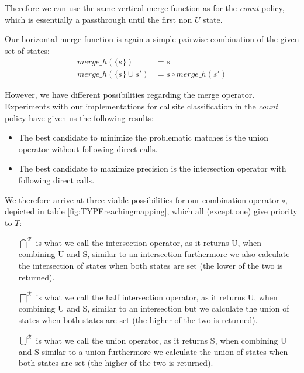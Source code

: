 Therefore we can use the same vertical merge function as for the \emph{count} policy, which is essentially a passthrough until the first non $U$ state.

Our horizontal merge function is again a simple pairwise combination of the given set of states:
\begin{align}
merge\_h(\{s\}) &= s\\
merge\_h(\{s\} \cup s') &= s \circ merge\_h(s')
\end{align}

However, we have different possibilities regarding the merge operator. Experiments with our implementations for callsite classification in the \emph{count} policy have given us the following results:
\begin{itemize}
\item The best candidate to minimize the problematic matches is the union operator without following direct calls.
\item The best candidate to maximize precision is the intersection operator with following direct calls.
\end{itemize}

We therefore arrive at three viable possibilities for our combination operator $\circ$, depicted in table \ref{fig:TYPEreachingmapping}, which all (except one) give priority to $T$:
\begin{itemize}
\item [$\bigcap^{\mathcal{R}}$] is what we call the intersection operator, as it returns U, when combining U and S, similar to an intersection furthermore we also calculate the intersection of states when both states are set 
(the lower of the two is returned).
\item [$\bigsqcap^{\mathcal{R}}$] is what we call the half intersection operator, as it returns U, when combining U and S, 
similar to an intersection but we calculate the union of states when both states are set (the higher of the two is returned).
\item [$\bigcup^{\mathcal{R}}$] is what we call the union operator, as it returns S, when combining U and S similar to a union
furthermore we calculate the union of states when both states are set (the higher of the two is returned).
\end{itemize}

